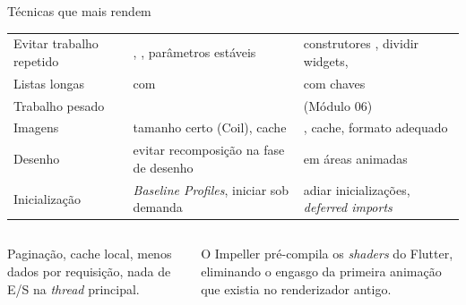 \documentclass[aspectratio=169,10pt]{beamer}
\begin{document}
\begin{frame}{Técnicas que mais rendem}
  \footnotesize
  \begin{tabularx}{\textwidth}{@{}p{2.6cm} L L@{}}
    \toprule
    &  &  \\
    \midrule
    Evitar trabalho repetido & , , parâmetros estáveis & construtores , dividir widgets,  \\
    Listas longas &  com  &  com chaves \\
    Trabalho pesado &  &  (Módulo 06) \\
    Imagens & tamanho certo (Coil), cache & , cache, formato adequado \\
    Desenho & evitar recomposição na fase de desenho &  em áreas animadas \\
    Inicialização & \emph{Baseline Profiles}, iniciar sob demanda & adiar inicializações, \emph{deferred imports} \\
    \bottomrule
  \end{tabularx}
  \vspace{4pt}
  \begin{columns}[T]
    \begin{column}{0.48\textwidth}
      \begin{conceito}
        Paginação, cache local, menos dados por requisição, nada de E/S na \emph{thread} principal.
      \end{conceito}
    \end{column}
    \begin{column}{0.48\textwidth}
      \begin{dica}
        O Impeller pré-compila os \emph{shaders} do Flutter, eliminando o engasgo da primeira animação que existia no renderizador antigo.
      \end{dica}
    \end{column}
  \end{columns}
\end{frame}
\end{document}
